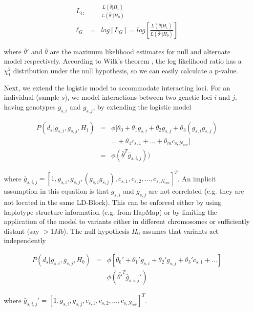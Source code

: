 \begin{eqnarray} \label{eq:gwasLogLikLogReg}
	L_G & = & \frac{L( \bar{\theta} | H_1 ) }{ L( \bar{\theta}' | H_0 ) }\\
	\ell_G & = & log \left[ L_G \right] = log \left[ \frac{L( \bar{\theta} | H_1 ) }{ L( \bar{\theta}' | H_0 ) } \right]
\end{eqnarray}

\noindent where $\bar{\theta}'$ and $\bar{\theta}$ are the maximum likelihood estimates for null and alternate model respectively. According to Wilk's theorem \cite{wilks1938large}, the log likelihood ratio has a $\chi^2_1$ distribution under the null hypothesis, so we can easily calculate a p-value.

Next, we extend the logistic model to accommodate interacting loci. For an individual (sample $s$), we model interactions between two genetic loci $i$ and $j$, having genotypes $g_{s,i}$ and $g_{s,j}$, by extending the logistic model

\begin{eqnarray} \label{eq:gwasLogRegH1}
    P( d_s | g_{s,i},g_{s,j}, H_1) & = & \phi[ \theta_0 + \theta_1 g_{s,i} + \theta_2 g_{s,j} + \theta_3 (g_{s,i} g_{s,j}) \\
    & & ... + \theta_4 c_{s,1} + ... + \theta_m c_{s,N_{cov}} ] \\
    & = & \phi( \bar{\theta}^T \bar{g}_{s,i,j}) )
\end{eqnarray}

\noindent where $\bar{g}_{s,i,j} =  [1, g_{s,i}, g_{s,j}, ( g_{s,i} g_{s,j}), c_{s,1}, c_{s,2}, ..., c_{s,N_{cov}} ]^T$. An implicit assumption in this equation is that $g_{s,i}$ and $g_{s,j}$ are not correlated (e.g. they are not located in the same LD-Block). This can be enforced either by using haplotype structure information (e.g. from HapMap) or by limiting the application of the model to variants either in different chromosomes or sufficiently distant (say $> 1Mb$). The null hypothesis $H_0$ assumes that variants act independently

\begin{eqnarray} \label{eq:gwasLogRegH0}
    P( d_s | g_{s,i},g_{s,j}, H_0) & = & \phi[ \theta_0' + \theta_1' g_{s,i} + \theta_2' g_{s,j} + \theta_3' c_{s,1} + ... ] \\
   & = & \phi( \bar{\theta'}^T \bar{g}_{s,i,j}' )
\end{eqnarray}

\noindent where $\bar{g}_{s,i,j}' =  [1, g_{s,i}, g_{s,j}, c_{s,1} , c_{s,2}, ..., c_{s,N_{cov}} ]^T$.


